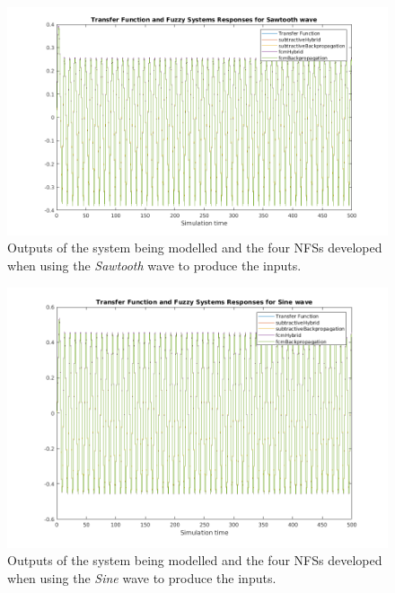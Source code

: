 \documentclass[11pt]{article}
\begin{document}
\begin{figure}[H]
	\centering
	\includegraphics[scale=0.5]{images/assessment_sawtooth.png}
	\caption{Outputs of the system being modelled and the four NFSs developed when using the \emph{Sawtooth} wave to produce the inputs.}
	\label{results_sawtooth}
\end{figure}

\begin{figure}[H]
	\centering
	\includegraphics[scale=0.5]{images/assessment_sine.png}
	\caption{Outputs of the system being modelled and the four NFSs developed when using the \emph{Sine} wave to produce the inputs.}
	\label{results_sine}
\end{figure}
\end{document}

